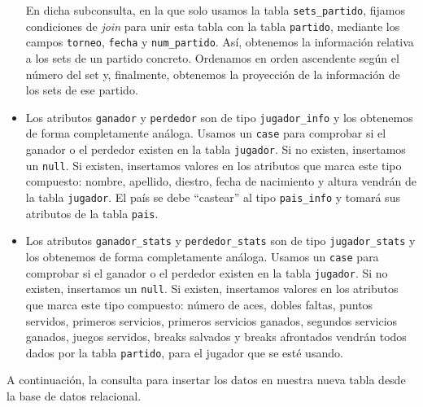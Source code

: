 \begin{itemize}
En dicha subconsulta, en la que solo usamos la tabla \texttt{sets\_partido}, fijamos condiciones de \textit{join} para unir esta tabla con la tabla \texttt{partido}, mediante los campos \texttt{torneo}, \texttt{fecha} y \texttt{num\_partido}. Así, obtenemos la información relativa a los sets de un partido concreto. Ordenamos en orden ascendente según el número del set y, finalmente, obtenemos la proyección de la información de los sets de ese partido.
\item Los atributos \texttt{ganador} y \texttt{perdedor} son de tipo \texttt{jugador\_info} y los obtenemos de forma completamente análoga. Usamos un \texttt{case} para comprobar si el ganador o el perdedor existen en la tabla \texttt{jugador}. Si no existen, insertamos un \texttt{null}. Si existen, insertamos valores en los atributos que marca este tipo compuesto: nombre, apellido, diestro, fecha de nacimiento y altura vendrán de la tabla \texttt{jugador}. El país se debe ``castear'' al tipo \texttt{pais\_info} y tomará sus atributos de la tabla \texttt{pais}.
\item Los atributos \texttt{ganador\_stats} y \texttt{perdedor\_stats} son de tipo \texttt{jugador\_stats} y los obtenemos de forma completamente análoga. Usamos un \texttt{case} para comprobar si el ganador o el perdedor existen en la tabla \texttt{jugador}. Si no existen, insertamos un \texttt{null}. Si existen, insertamos valores en los atributos que marca este tipo compuesto: número de aces, dobles faltas, puntos servidos, primeros servicios, primeros servicios ganados, segundos servicios ganados, juegos servidos, breaks salvados y breaks afrontados vendrán todos dados por la tabla \texttt{partido}, para el jugador que se esté usando.
\end{itemize}

\noindent A continuación, la consulta para insertar los datos en nuestra nueva tabla desde la base de datos relacional.


